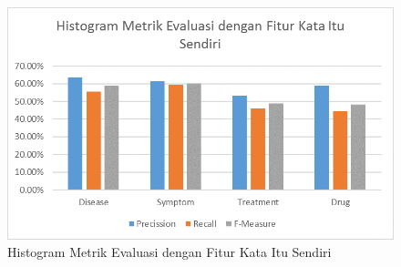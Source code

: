 \begin{figure}
	\centering
	\includegraphics[width=0.85\linewidth]{images/radit}
	\caption{Histogram Metrik Evaluasi dengan Fitur Kata Itu Sendiri}
	\label{fig:radit}
\end{figure}

